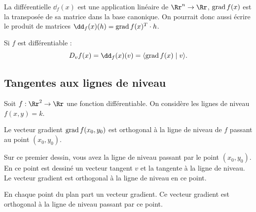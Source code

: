 \documentclass[12pt, class=report,crop=false]{standalone}
\begin{document}
La différentielle $\dd_f(x)$ est une application linéaire de $\Rr^n \to \Rr$, $\operatorname{grad} f (x)$ est la transposée de sa matrice dans la base canonique.
On pourrait donc aussi écrire le produit de matrices $\dd_f(x)(h) = \grad f (x)^T \cdot h$.

\bigskip


Si $f$ est différentiable :
$$D_v f(x) = \dd_f (x) (v) = \langle \grad f (x) \mid v \rangle.$$



\subsection{Tangentes aux lignes de niveau}


Soit $f : \Rr^2 \to \Rr$ une fonction différentiable. On considère les lignes de niveau $f(x,y)=k$.


\begin{proposition}
Le vecteur gradient $\operatorname{grad} f(x_0,y_0)$ est orthogonal à la ligne de niveau de $f$ passant au point $(x_0,y_0)$. 
\end{proposition}


Sur ce premier dessin, vous avez  la ligne de niveau passant par le point $(x_0,y_0)$. En ce point est dessiné  un vecteur tangent $v$ et la tangente à la ligne de niveau. 
Le vecteur gradient  est orthogonal à la ligne de niveau en ce point.


\bigskip


\bigskip

En chaque point du plan part un vecteur gradient. Ce vecteur gradient est orthogonal à la ligne de niveau passant par ce point.

\end{document}
